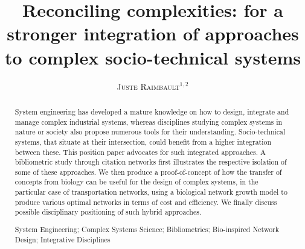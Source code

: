 \documentclass[runningheads,a4paper]{llncs2e/llncs}
\newcommand{\keywords}[1]{\par\addvspace\baselineskip
\noindent\keywordname\enspace\ignorespaces#1}
\newcommand{\noun}[1]{\textsc{#1}}
\begin{document}
\mainmatter  %




\title{Reconciling complexities: for a stronger integration of approaches to complex socio-technical systems}


%
%
\author{\noun{Juste Raimbault}$^{1,2}$}
%


\maketitle


\begin{abstract}
System engineering has developed a mature knowledge on how to design, integrate and manage complex industrial systems, whereas disciplines studying complex systems in nature or society also propose numerous tools for their understanding. Socio-technical systems, that situate at their intersection, could benefit from a higher integration between these. This position paper advocates for such integrated approaches. A bibliometric study through citation networks first illustrates the respective isolation of some of these approaches. We then produce a proof-of-concept of how the transfer of concepts from biology can be useful for the design of complex systems, in the particular case of transportation networks, using a biological network growth model to produce various optimal networks in terms of cost and efficiency. We finally discuss possible disciplinary positioning of such hybrid approaches.
\keywords{System Engineering; Complex Systems Science; Bibliometrics; Bio-inspired Network Design; Integrative Disciplines}
\end{abstract}
\end{document}
